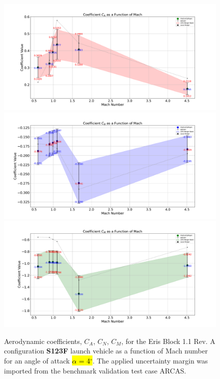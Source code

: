 \documentclass[12pt]{article}
\begin{document}
\begin{figure}[H]
    \centering
    \vspace{-0.4cm}
    \includegraphics[width=0.995\linewidth]{figs/eris/S123F/fixed/Eris4_CA.pdf}\\
    \vspace{-0.4cm}
    \includegraphics[width=0.995\linewidth]{figs/eris/S123F/fixed/Eris4_CN.pdf}\\
    \vspace{-0.4cm}
    \includegraphics[width=0.995\linewidth]{figs/eris/S123F/fixed/Eris4_CM.pdf}
    \caption{Aerodynamic coefficients, $C_A$, $C_N$, $C_M$, for the Eris Block 1.1 Rev. A configuration \textbf{S123F} launch vehicle as a function of Mach number for an angle of attack \hl{$\alpha$ = 4$^\circ$}. The applied uncertainty margin was imported from the benchmark validation test case ARCAS.}
    \label{fig:eris-CA-CA-CM_alpha4}
\end{figure}
%
\end{document}
